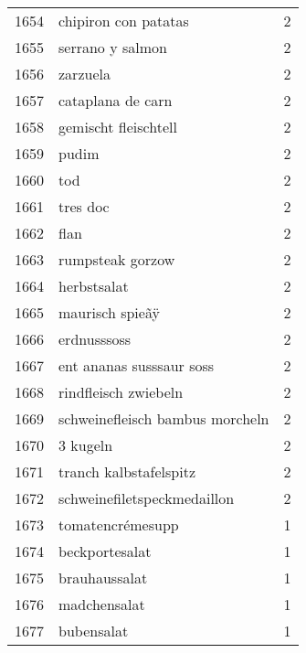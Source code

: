 \begin{tabular}{llr}
1654 &                               chipiron con patatas &      2 \\
1655 &                                   serrano y salmon &      2 \\
1656 &                                           zarzuela &      2 \\
1657 &                                  cataplana de carn &      2 \\
1658 &                               gemischt fleischtell &      2 \\
1659 &                                              pudim &      2 \\
1660 &                                                tod &      2 \\
1661 &                                           tres doc &      2 \\
1662 &                                               flan &      2 \\
1663 &                                   rumpsteak gorzow &      2 \\
1664 &                                        herbstsalat &      2 \\
1665 &                                    maurisch spieãÿ &      2 \\
1666 &                                        erdnusssoss &      2 \\
1667 &                           ent ananas susssaur soss &      2 \\
1668 &                               rindfleisch zwiebeln &      2 \\
1669 &                    schweinefleisch bambus morcheln &      2 \\
1670 &                                           3 kugeln &      2 \\
1671 &                             tranch kalbstafelspitz &      2 \\
1672 &                        schweinefiletspeckmedaillon &      2 \\
1673 &                                   tomatencrémesupp &      1 \\
1674 &                                     beckportesalat &      1 \\
1675 &                                      brauhaussalat &      1 \\
1676 &                                       madchensalat &      1 \\
1677 &                                         bubensalat &      1 \\

\end{tabular}
